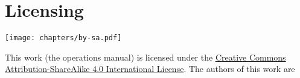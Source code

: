 \section{Licensing}

\texttt{[image: chapters/by-sa.pdf]}

This work (the operations manual) is licensed under the \href{http://creativecommons.org/licenses/by-sa/4.0/}{Creative Commons Attribution-ShareAlike 4.0 International License}.  The authors of this work are 
